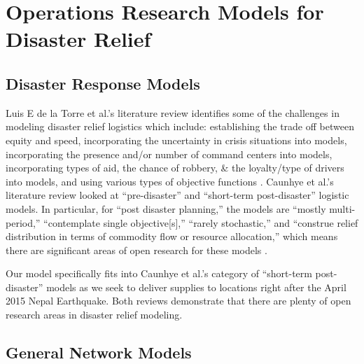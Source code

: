 \documentclass[11pt]{article}
\begin{document}
\section{Operations Research Models for Disaster Relief}

\subsection{Disaster Response Models}

Luis E de la Torre et al.'s literature review identifies some of the challenges in modeling disaster relief logistics which include: establishing the trade off between equity and speed, incorporating the uncertainty in crisis situations into models, incorporating the presence and/or number of command centers into models, incorporating types of aid, the chance of robbery, \& the loyalty/type of drivers into models, and using various types of objective functions \cite{luis2012disaster}. Caunhye et al.'s literature review looked at ``pre-disaster'' and ``short-term post-disaster'' logistic models.  In particular, for ``post disaster planning,” the models are ``mostly multi-period,” ``contemplate single objective[s],” ``rarely stochastic,” and ``construe relief distribution in terms of commodity flow or resource allocation,'' which means there are significant areas of open research for these models \cite{caunhye2012optimization}.  

Our model specifically fits into Caunhye et al.'s category of ``short-term post-disaster'' models as we seek to deliver supplies to locations right after the April 2015 Nepal Earthquake.  Both reviews demonstrate that there are plenty of open research areas in disaster relief modeling.


\subsection{General Network Models}
\end{document}
